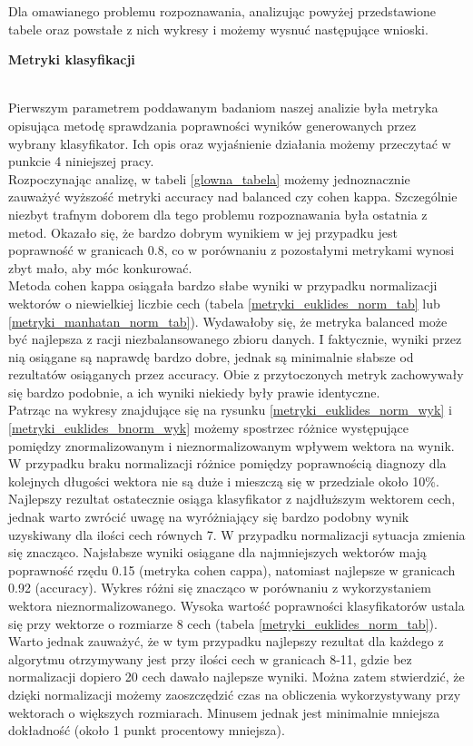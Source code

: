 \documentclass[12pt]{article}
\begin{document}
\indent Dla omawianego problemu rozpoznawania, analizując powyżej przedstawione tabele oraz powstałe z nich wykresy i możemy wysnuć następujące wnioski.\\
\centerline{\textbf{Metryki klasyfikacji }}\\
\indent Pierwszym parametrem poddawanym badaniom naszej analizie była metryka opisująca metodę sprawdzania poprawności wyników generowanych przez wybrany klasyfikator. Ich opis oraz wyjaśnienie działania możemy przeczytać w punkcie 4 niniejszej pracy. \\
\indent Rozpoczynając analizę, w tabeli \ref{glowna_tabela} możemy jednoznacznie zauważyć wyższość metryki accuracy nad balanced czy cohen kappa. Szczególnie niezbyt trafnym doborem dla tego problemu rozpoznawania była ostatnia z metod. Okazało się, że bardzo dobrym wynikiem w jej przypadku jest poprawność w granicach 0.8, co w porównaniu z pozostałymi metrykami wynosi zbyt mało, aby móc konkurować. \\
\indent Metoda cohen kappa osiągała bardzo słabe wyniki w przypadku normalizacji wektorów o niewielkiej liczbie cech (tabela \ref{metryki_euklides_norm_tab} lub \ref{metryki_manhatan_norm_tab}). Wydawałoby się, że metryka balanced może być najlepsza z racji niezbalansowanego zbioru danych. I faktycznie, wyniki przez nią osiągane są naprawdę bardzo dobre, jednak są minimalnie słabsze od rezultatów osiąganych przez accuracy. Obie z przytoczonych metryk zachowywały się bardzo podobnie, a ich wyniki niekiedy były prawie identyczne.\\
\indent Patrząc na wykresy znajdujące się na rysunku \ref{metryki_euklides_norm_wyk} i \ref{metryki_euklides_bnorm_wyk} możemy spostrzec różnice występujące pomiędzy znormalizowanym i nieznormalizowanym wpływem wektora na wynik. W przypadku braku normalizacji różnice pomiędzy poprawnością diagnozy dla kolejnych długości wektora nie są duże i mieszczą się w przedziale około 10\%. Najlepszy rezultat ostatecznie osiąga klasyfikator z najdłuższym wektorem cech, jednak warto zwrócić uwagę na wyróżniający się bardzo podobny wynik uzyskiwany dla ilości cech równych 7. W przypadku normalizacji sytuacja zmienia się znacząco. Najsłabsze wyniki osiągane dla najmniejszych wektorów mają poprawność rzędu 0.15 (metryka cohen cappa), natomiast najlepsze w granicach 0.92 (accuracy). Wykres różni się znacząco w porównaniu z wykorzystaniem wektora nieznormalizowanego. Wysoka wartość poprawności klasyfikatorów ustala się przy wektorze o rozmiarze 8 cech (tabela \ref{metryki_euklides_norm_tab}).  Warto jednak zauważyć, że w tym przypadku najlepszy rezultat dla każdego z algorytmu otrzymywany jest przy ilości cech w granicach 8-11, gdzie bez normalizacji dopiero  20 cech dawało najlepsze wyniki. Można zatem stwierdzić, że dzięki normalizacji możemy zaoszczędzić czas na obliczenia wykorzystywany przy wektorach o większych rozmiarach. Minusem jednak jest minimalnie mniejsza dokładność (około 1 punkt procentowy mniejsza). \\
\end{document}
